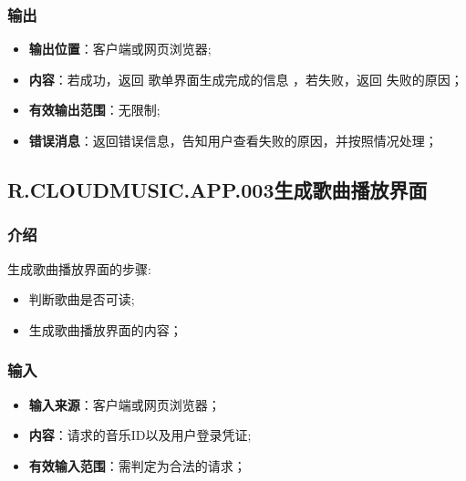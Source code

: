 \subsubsection{输出}
\begin{itemize}
	\item \textbf{输出位置}：客户端或网页浏览器;
	\item \textbf{内容}：若成功，返回 歌单界面生成完成的信息 ，若失败，返回 失败的原因；
	\item \textbf{有效输出范围}：无限制;
	\item \textbf{错误消息}：返回错误信息，告知用户查看失败的原因，并按照情况处理；
\end{itemize}

\subsection{R.CLOUDMUSIC.APP.003生成歌曲播放界面}
\subsubsection{介绍}
生成歌曲播放界面的步骤:
	\begin{itemize}
		\item 判断歌曲是否可读;
		\item 生成歌曲播放界面的内容；
	\end{itemize}
\subsubsection{输入}
	\begin{itemize}
		\item \textbf{输入来源}：客户端或网页浏览器；
		\item \textbf{内容}：请求的音乐ID以及用户登录凭证;
		\item \textbf{有效输入范围}：需判定为合法的请求；
	\end{itemize}
